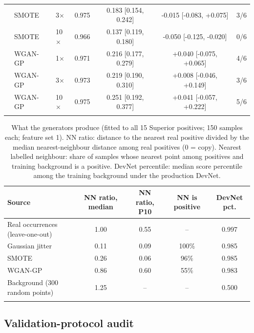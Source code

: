 \documentclass[pdflatex,sn-apa]{sn-jnl}
\begin{document}
\begin{table}[t]
\begin{tabular*}{\textwidth}{@{\extracolsep\fill}lllcccc}
 & SMOTE & 3$\times$ & 0.975 & 0.183 [0.154, 0.242] & -0.015 [-0.083, +0.075] & 3/6 \\
 & SMOTE & 10$\times$ & 0.966 & 0.137 [0.119, 0.180] & -0.050 [-0.125, -0.020] & 0/6 \\
 & WGAN-GP & 1$\times$ & 0.971 & 0.216 [0.177, 0.279] & +0.040 [-0.075, +0.065] & 4/6 \\
 & WGAN-GP & 3$\times$ & 0.973 & 0.219 [0.190, 0.310] & +0.008 [-0.046, +0.149] & 3/6 \\
 & WGAN-GP & 10$\times$ & 0.975 & 0.251 [0.192, 0.377] & +0.041 [-0.057, +0.222] & 5/6 \\
\botrule
\end{tabular*}
\end{table}

\begin{table}[t]
\caption{What the generators produce (fitted to all 15 Superior positives; 150 samples each; feature set 1). NN ratio: distance to the nearest real positive divided by the median nearest-neighbour distance among real positives (0 = copy). Nearest labelled neighbour: share of samples whose nearest point among positives and training background is a positive. DevNet percentile: median score percentile among the training background under the production DevNet.}\label{tab:aug-diag}
\footnotesize
\setlength{\tabcolsep}{2.5pt}
\begin{tabular*}{\textwidth}{@{\extracolsep\fill}lcccc}
\toprule
Source & NN ratio, median & NN ratio, P10 & NN is positive & DevNet pct. \\
\midrule
Real occurrences (leave-one-out) & 1.00 & 0.55 & -- & 0.997 \\
Gaussian jitter & 0.11 & 0.09 & 100\% & 0.985 \\
SMOTE & 0.26 & 0.06 & 96\% & 0.985 \\
WGAN-GP & 0.86 & 0.60 & 55\% & 0.983 \\
Background (300 random points) & 1.25 & -- & -- & 0.500 \\
\botrule
\end{tabular*}
\end{table}

\subsection{Validation-protocol audit}\label{sec:res-audit}
\end{document}
